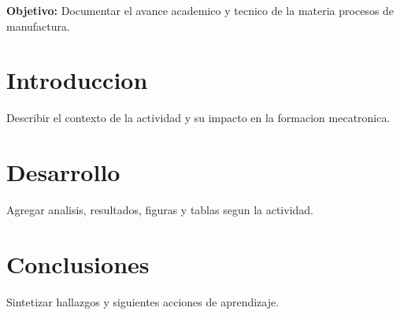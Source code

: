 \documentclass[spanish,letterpaper,oneside]{article}
\begin{document}
\templatePortrait
\templatePagecfg
\onehalfspacing

\begin{abstractd}
\textbf{Objetivo:} Documentar el avance academico y tecnico de la materia procesos de manufactura.
\end{abstractd}

\templateIndex
\templateFinalcfg

\section{Introduccion}
Describir el contexto de la actividad y su impacto en la formacion mecatronica.

\section{Desarrollo}
Agregar analisis, resultados, figuras y tablas segun la actividad.

\section{Conclusiones}
Sintetizar hallazgos y siguientes acciones de aprendizaje.



\end{document}
